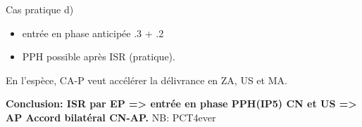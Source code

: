 \begin{frame}{Cas pratique d)}

\begin{block}{}
\begin{itemize}
    \item entrée en phase anticipée .3 + .2
    \item PPH possible après ISR (pratique).
\end{itemize}
\end{block}

En l'espèce, CA-P veut accélérer la délivrance en ZA, US et MA.\newline

\textbf{Conclusion: ISR par EP => entrée en phase PPH(IP5) CN et US => AP Accord bilatéral CN-AP.}\newline
NB: PCT4ever

\end{frame}
